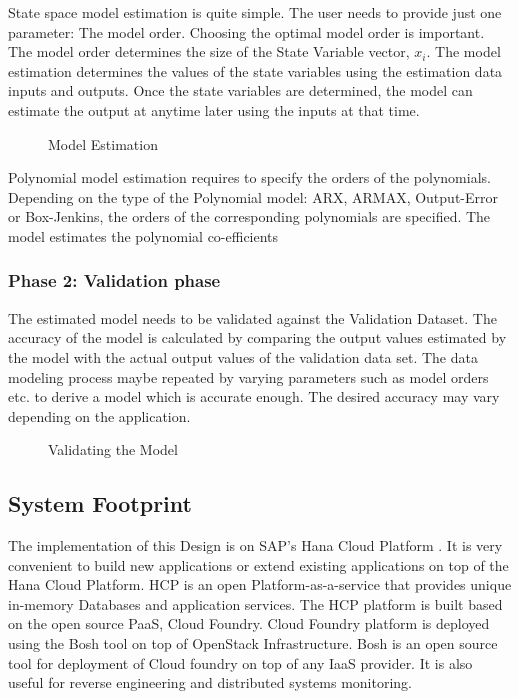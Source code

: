 \documentclass[article,type=msc,colorback,12pt,accentcolor=tud7b]{tudthesis}
\begin{document}
 	State space model estimation is quite simple. The user needs to provide just one parameter: The model order. Choosing the optimal model order is important. The model order determines the size of the State Variable vector, $x_i$. The model estimation determines the values of the state variables using the estimation data inputs and outputs. Once the state variables are determined, the model can estimate the output at anytime later using the inputs at that time.
 	
 	 	 \begin{figure}[!h]
 	 	 	\begin{center}
 	 	 		\makebox[\textwidth]{\texttt{[image: C6]}}
 	 	 	\end{center}
 	 	 	\caption{Model Estimation}
 	 	 \end{figure}

Polynomial model estimation requires to specify the orders of the polynomials. Depending on the type of the Polynomial model: ARX, ARMAX, Output-Error or Box-Jenkins,  the orders of the corresponding polynomials are specified. The model estimates the polynomial co-efficients

\subsubsection{Phase 2: Validation phase}

The estimated model needs to be validated against the Validation Dataset. The accuracy of the model is calculated by comparing the output values estimated by the model with the actual output values of the validation data set. The data modeling process maybe repeated by varying parameters such as model orders etc. to derive a model which is accurate enough. The desired accuracy may vary depending on the application.

  \begin{figure}[!h]
  	\begin{center}
  		\makebox[\textwidth]{\texttt{[image: C7]}}
  	\end{center}
  	\caption{Validating the Model}
  \end{figure}

\subsection{System Footprint}
	The implementation of this Design is on SAP's Hana Cloud Platform \cite{hcp}. It is very convenient to build new applications or extend existing applications on top of the Hana Cloud Platform. HCP is an open Platform-as-a-service that provides unique in-memory Databases and application services. The HCP platform is built based on the open source PaaS, Cloud Foundry. Cloud Foundry platform is deployed using the Bosh tool on top of OpenStack Infrastructure. Bosh is an open source tool for deployment of Cloud foundry on top of any IaaS provider. It is also useful for reverse engineering and distributed systems monitoring.
	
\end{document}
